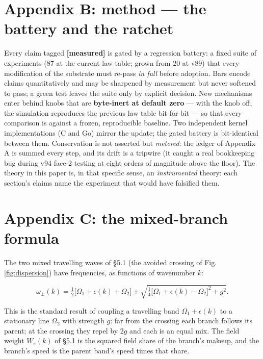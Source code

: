 \section{Appendix B: method --- the battery and the
ratchet}\label{appendix-b-method-the-battery-and-the-ratchet}

Every claim tagged \textbf{{[}measured{]}} is gated by a regression
battery: a fixed suite of experiments (87 at the current law table;
grown from 20 at v89) that every modification of the substrate must
re-pass \emph{in full} before adoption. Bars encode claims
quantitatively and may be sharpened by measurement but never softened to
pass; a green test leaves the suite only by explicit decision. New
mechanisms enter behind knobs that are \textbf{byte-inert at default
zero} --- with the knob off, the simulation reproduces the previous law
table bit-for-bit --- so that every comparison is against a frozen,
reproducible baseline. Two independent kernel implementations (C and Go)
mirror the update; the gated battery is bit-identical between them.
Conservation is not asserted but \emph{metered}: the ledger of Appendix
A is summed every step, and its drift is a tripwire (it caught a real
bookkeeping bug during v94 face-2 testing at eight orders of magnitude
above the floor). The theory in this paper is, in that specific sense,
an \emph{instrumented} theory: each section's claims name the experiment
that would have falsified them.

\section{Appendix C: the mixed-branch
formula}\label{appendix-c-the-mixed-branch-formula}

The two mixed travelling waves of §5.1 (the avoided crossing of Fig.
\ref{fig:dispersion}) have frequencies, as functions of wavenumber
\(k\):

\[
\omega_\pm(k) = \tfrac{1}{2}\big[\Omega_1 + \epsilon(k) + \Omega_2\big]
 \pm \sqrt{\tfrac{1}{4}\big[\Omega_1 + \epsilon(k) - \Omega_2\big]^2 + g^2}.
\]

This is the standard result of coupling a travelling band
\(\Omega_1 + \epsilon(k)\) to a stationary line \(\Omega_2\) with
strength \(g\): far from the crossing each branch follows its parent; at
the crossing they repel by \(2g\) and each is an equal mix. The field
weight \(W_e(k)\) of §5.1 is the squared field share of the branch's
makeup, and the branch's speed is the parent band's speed times that
share.
